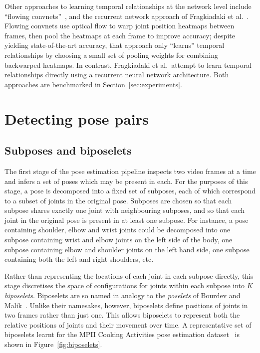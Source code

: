 \documentclass[runningheads]{llncs}
\begin{document}
Other approaches to learning temporal relationships at the network level include
``flowing convnets''~\cite{pfister2015flowing}, and the recurrent network
approach of Fragkiadaki et al.~\cite{fragkiadaki2015recurrent}. Flowing convnets
use optical flow to warp joint position heatmaps between frames, then pool the
heatmaps at each frame to improve accuracy; despite yielding state-of-the-art
accuracy, that approach only ``learns'' temporal relationships by choosing a
small set of pooling weights for combining backwarped heatmaps. In contrast,
Fragkiadaki et al.\ attempt to learn temporal relationships directly using a
recurrent neural network architecture. Both approaches are benchmarked in
Section~\ref{sec:experiments}.

\section{Detecting pose pairs}

\subsection{Subposes and biposelets}\label{sec:decomp}

The first stage of the pose estimation pipeline inspects two video frames at a
time and infers a set of poses which may be present in each. For the purposes of
this stage, a pose is decomposed into a fixed set of subposes, each of which
correspond to a subset of joints in the original pose. Subposes are chosen so
that each subpose shares exactly one joint with neighbouring subposes, and so
that each joint in the original pose is present in at least one subpose. For
instance, a pose containing shoulder, elbow and wrist joints could be decomposed
into one subpose containing wrist and elbow joints on the left side of the body,
one subpose containing elbow and shoulder joints on the left hand side, one
subpose containing both the left and right shoulders, etc.

Rather than representing the locations of each joint in each subpose directly,
this stage discretises the space of configurations for joints within each
subpose into $K$ \textit{biposelets}. Biposelets are so named in analogy to the
\textit{poselets} of Bourdev and Malik~\cite{bourdev2009poselets}. Unlike their
namesakes, however, biposelets define positions of joints in two frames rather
than just one. This allows biposelets to represent both the relative positions
of joints and their movement over time. A representative set of biposelets
learnt for the MPII Cooking Activities pose estimation
dataset~\cite{rohrbach2012database} is shown in Figure~\ref{fig:biposelets}.
\end{document}
